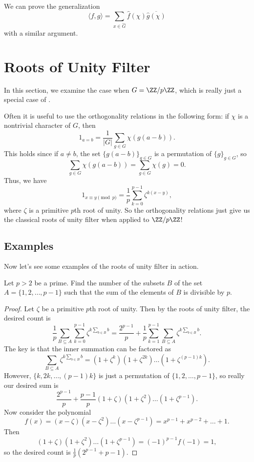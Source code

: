 \documentclass{scrartcl}
\begin{document}
\begin{remark}
	We can prove the generalization
	$$\langle f, g\rangle  = \sum_{x\in \widehat{G}} \widehat{f}(\chi) \overline{\widehat{g}(\chi)}$$
	with a similar argument. 
\end{remark}

\section{Roots of Unity Filter}

In this section, we examine the case when $G = \ZZ/p\ZZ$, which 
is really just a special case of . 

Often it is useful to use the orthogonality relations in the following form: 
if $\chi$ is a nontrivial character of $G$, then  
$$1_{a=b} = \frac{1}{|G|} \sum_{g\in G} \chi(g(a-b)).$$
This holds since if $a\neq b$, the set $\{g(a-b)\}_{g\in G}$ is a permutation of 
$\{g\}_{g\in G}$, so 
$$\sum_{g\in G} \chi(g(a-b)) = \sum_{g\in G}\chi(g) = 0.$$
Thus, we have 
$$1_{x\equiv y\pmod p} = \frac{1}{p}\sum_{k=0}^{p-1} \zeta^{k(x-y)},$$
where $\zeta$ is a primitive $p$th root of unity. 
So the orthogonality relations just give us the classical roots of unity filter when 
applied to $\ZZ/p\ZZ$!

\subsection{Examples}

Now let's see some examples of the roots of unity filter in action. 

\begin{example}
	Let $p>2$ be a prime. Find the number of the subsets $B$ of the set 
	$A=\{1,2,\ldots,p-1\}$ such that the sum of the elements of $B$ is divisible by $p$.
\end{example}

\begin{proof}
	Let $\zeta$ be a primitive $p$th root of unity. 
	Then by the roots of unity filter, the desired count is 
	$$\frac{1}{p} \sum_{B\subseteq A} \sum_{k=0}^{p-1} \zeta^{k\sum_{b\in B} b}
	= \frac{2^{p-1}}{p}+\frac{1}{p} \sum_{k=1}^{p-1}\sum_{B\subseteq A} \zeta^{k\sum_{b\in B} b}.$$
	The key is that the inner summation can be factored as 
	$$\sum_{B\subseteq A} \zeta^{k\sum_{b\in B} b} = (1+\zeta^k)(1+\zeta^{2k})\dots (1+\zeta^{(p-1)k}).$$
	However, $\{k, 2k, \dots, (p-1)k\}$ is just a permutation of $\{1, 2, \dots, p-1\}$, so 
	really our desired sum is 
	$$\frac{2^{p-1}}{p}+\frac{p-1}{p}(1+\zeta)(1+\zeta^2)\dots(1+\zeta^{p-1}).$$
	Now consider the polynomial 
	$$f(x) = (x-\zeta)(x-\zeta^2) \dots (x-\zeta^{p-1}) = x^{p-1}+x^{p-2}+\dots+1.$$
	Then 
	$$(1+\zeta)(1+\zeta^2)\dots(1+\zeta^{p-1}) = (-1)^{p-1}f(-1) = 1,$$
	so the desired count is $\frac{1}{p}(2^{p-1}+p-1)$. 
\end{proof}
\end{document}
